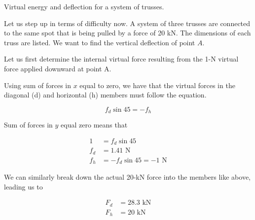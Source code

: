 \documentclass[
fontsize=10pt,
a4paper,
twosides=false,
open=any,
svgnames,
]{kaobook} %
\begin{document}
\begin{example} Virtual energy and deflection for a system of trusses.

  Let us step up in terms of difficulty now. A system of three trusses are connected to the same spot that is being pulled by a force of 20 kN. The dimensions of each truss are listed. We want to find the vertical deflection of point $A$.

  \centering

  Let us first determine the internal virtual force resulting from the 1-N virtual force applied downward at point A.
  
  Using sum of forces in $x$ equal to zero, we have that the virtual forces in the diagonal (d) and horizontal (h) members must follow the equation.
  
  \begin{equation*}
    f_d \sin 45 = -f_h
  \end{equation*}
  
  Sum of forces in $y$ equal zero means that
  
  \begin{align*}
    1 &= f_d \sin 45 \\
    f_d &= 1.41 \text{ N} \\
    f_h &= -f_d \sin 45 = -1 \text{ N}
  \end{align*}

  We can similarly break down the actual 20-kN force into the members like above, leading us to
  
  \begin{align*}
    F_d &= 28.3 \text{ kN} \\
    F_h &= 20 \text{ kN}
  \end{align*}


\end{example}
\end{document}
